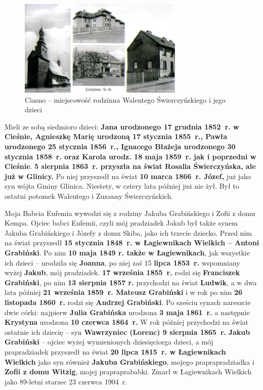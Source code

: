 \begin{figure}[!h]
\begin{center}
\includegraphics[width=0.7\textwidth]{photo/ciasno.jpg}
\caption[Ciasno]{Ciasno -- miejscowość rodzinna Walentego Świerczyńskiego i jego dzieci}
\end{center}
\end{figure}

Mieli ze sobą siedmioro dzieci: \textbf{Jana urodzonego 17 grudnia 1852~r. w Cieśnie, Agnieszkę Marię urodzoną 17 stycznia 1855~r., Pawła urodzonego 25 stycznia 1856~r., Ignacego Błażeja urodzonego 30 stycznia 1858~r. oraz Karola urodz. 18 maja 1859~r. jak i poprzedni w Cieśnie}. \textbf{5 sierpnia 1863~r. przyszła na świat Rosalia Świerczyńska, ale  już w Glinicy.} Po niej przyszedł na świat \textbf{10 marca 1866~r. Józef,} już jako syn wójta Gminy Glinica. Niestety, w cztery lata później już nie żył. Był to ostatni potomek Walentego i Zuzanny Świerczyńskich.

Moja Babcia Eufemia wywodzi się z rodziny Jakuba Grabińskiego i Zofii z domu Kempa. Ojciec babci Eufemii, czyli mój pradziadek Jakub był także synem Jakuba Grabińskiego i Józefy z domu Skiba, jako ich trzecie dziecko. Przed nim na świat przyszedł \textbf{15 stycznia 1848~r. w Łagiewnikach Wielkich – Antoni Grabiński}. Po nim \textbf{10 maja 1849 r. także w Łagiewnikach}, jak wszystkie ich dzieci – urodziła się \textbf{Joanna}, po niej zaś 15 \textbf{lipca 1853~r.} wspomniany wyżej \textbf{Jakub}, mój pradziadek. \textbf{17 września 1855~r.} rodzi się \textbf{Franciszek Grabiński}, po nim \textbf{13 sierpnia 1857 r.} przychodzi na świat \textbf{Ludwik}, a w dwa lata później \textbf{21 września 1859~r. Mateusz Grabiński} i w rok po nim \textbf{26 listopada 1860~r.} rodzi się \textbf{Andrzej Grabiński}. Po sześciu synach nareszcie dwie córki: najpierw \textbf{Julia Grabińska} urodzona \textbf{3 maja 1861~r.} a następnie \textbf{Krystyna} 	urodzona \textbf{10 czerwca 1864~r.} W rok później przychodzi na świat ostatnie ich dziecię – syn \textbf{Wawrzyniec (Lorenc) 9 sierpnia 1865~r.} \textbf{Jakub Grabiński} – ojciec wyżej wymienionych dziesięciorga dzieci, a mój prapradziadek przyszedł na świat \textbf{20 lipca 1815~r. w Łagiewnikach Wielkich} jako syn również \textbf{Jakuba Grabińskiego}, mojego praprapradziadka i \textbf{Zofii z domu Witzig}, mojej prapraprababki. Zmarł w Łagiewnikach Wielkich jako 89-letni starzec 23 czerwca 1904~r.

